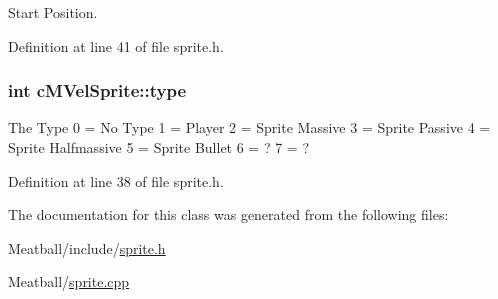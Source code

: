 Start Position. 



Definition at line 41 of file sprite.\-h.

\hypertarget{classc_m_vel_sprite_ab23eadf4d20417f5e5b418cd7cffe8e3}{
\subsubsection[{type}]{\setlength{\rightskip}{0pt plus 5cm}int c\-M\-Vel\-Sprite\-::type}}\label{classc_m_vel_sprite_ab23eadf4d20417f5e5b418cd7cffe8e3}
The Type 0 = No Type 1 = Player 2 = Sprite Massive 3 = Sprite Passive 4 = Sprite Halfmassive 5 = Sprite Bullet 6 = ? 7 = ? 

Definition at line 38 of file sprite.\-h.



The documentation for this class was generated from the following files\-:\begin{DoxyCompactItemize}
\item 
Meatball/include/\hyperlink{sprite_8h}{sprite.\-h}\item 
Meatball/\hyperlink{sprite_8cpp}{sprite.\-cpp}\end{DoxyCompactItemize}
